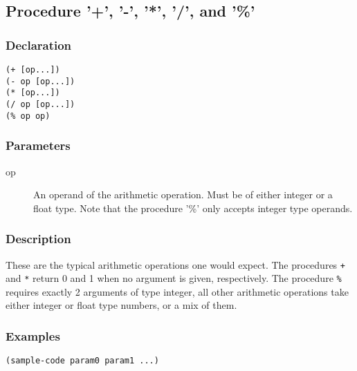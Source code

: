 \subsection{Procedure '+', '-', '*', '/', and '\%'}
\label{builtins/arithmetic-operations}

\subsubsection*{Declaration}
\begin{lstlisting}
(+ [op...])
(- op [op...])
(* [op...])
(/ op [op...])
(% op op)
\end{lstlisting}

\subsubsection*{Parameters}
\begin{description}
	\item[op] An operand of the arithmetic operation. Must be of either integer or a float type. Note that the procedure '\%' only accepts integer type operands.
\end{description}

\subsubsection*{Description}
These are the typical arithmetic operations one would expect. The procedures \lstinline|+| and \lstinline|*| return 0 and 1 when no argument is given, respectively. The procedure \lstinline|%| requires exactly 2 arguments of type integer, all other arithmetic operations take either integer or float type numbers, or a mix of them.

\subsubsection*{Examples}
\begin{lstlisting}
(sample-code param0 param1 ...)
\end{lstlisting}
